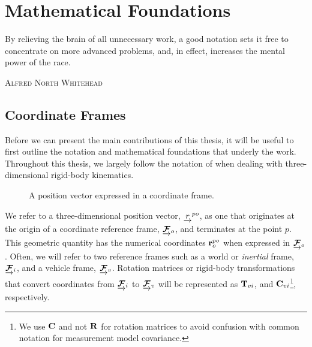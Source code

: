 \chapter{Mathematical Foundations}
\label{ch:math}
\epigraph{By relieving the brain of all unnecessary work, a good notation sets it free to concentrate on more advanced problems, and, in effect, increases the mental power of the race.}{\textsc{Alfred North Whitehead}}
  \section{Coordinate Frames}

Before we can present the main contributions of this thesis, it will be useful to first outline the notation and mathematical foundations that underly the work. Throughout this thesis, we largely follow the notation of \cite{Barfoot2017-ri} when dealing with three-dimensional rigid-body kinematics. 

\begin{figure}[h!]
\center
{}
%
%
\caption{A position vector expressed in a coordinate frame.}
\end{figure}

We refer to a three-dimensional position vector, $\underrightarrow{r}^{po}$, as one that originates at the origin of a coordinate reference frame, $\underrightarrow{ \boldsymbol{\mathbf{\mathcal{F}}} }_{o}$, and terminates at the point $p$. This geometric quantity has the numerical coordinates $\boldsymbol{\mathbf{r}}^{po}_o$ when expressed in $\underrightarrow{ \boldsymbol{\mathbf{\mathcal{F}}} }_{o}$. Often, we will refer to two reference frames such as a world or \textit{inertial} frame,  $\underrightarrow{ \boldsymbol{\mathbf{\mathcal{F}}} }_{i}$, and a vehicle frame, $\underrightarrow{ \boldsymbol{\mathbf{\mathcal{F}}} }_{v}$. Rotation matrices or rigid-body transformations that convert coordinates from $\underrightarrow{ \boldsymbol{\mathbf{\mathcal{F}}} }_{i}$ to $\underrightarrow{ \boldsymbol{\mathbf{\mathcal{F}}} }_{v}$ will be represented as $\boldsymbol{\mathbf{T}}_{vi}$, and $\boldsymbol{\mathbf{C}}_{vi}$\footnote{We use $\boldsymbol{\mathbf{C}}$ and not $\boldsymbol{\mathbf{R}}$ for rotation matrices to avoid confusion with common notation for measurement model covariance.}, respectively. 


